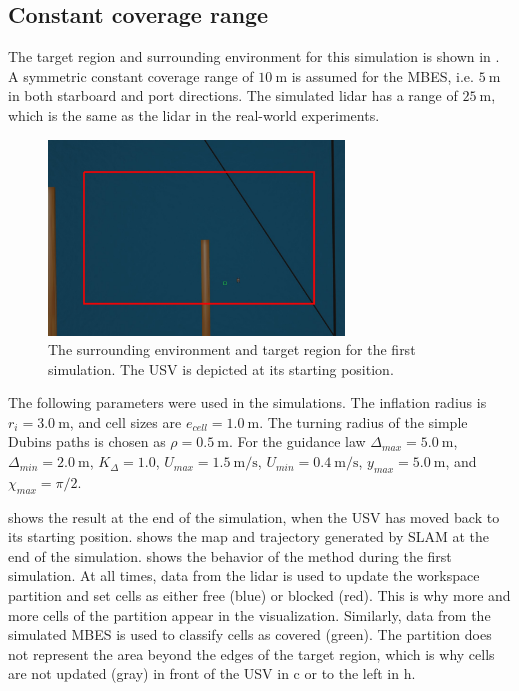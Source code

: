 \subsection{Constant coverage range} \label{sec:sim1}

The target region and surrounding environment for this simulation is shown in . A symmetric constant coverage range of $\SI{10}{\meter}$  is assumed for the MBES, i.e. $\SI{5}{\meter}$ in both starboard and port directions. The simulated lidar has a range of $\SI{25}{\meter}$, which is the same as the lidar in the real-world experiments.

\begin{figure}[h!]
	\centering
	\includegraphics[width=0.7\textwidth]{fig/simulations/target_region_bm_1}
	\caption[The surrounding environment and target region for the first simulation.]{The surrounding environment and target region for the first simulation. The USV is depicted at its starting position.}
	\label{fig:target_region_bm_1}
\end{figure}

The following parameters were used in the simulations. The inflation radius is $r_i = \SI{3.0}{\meter}$, and cell sizes are $e_{cell} = \SI{1.0}{\meter}$. The turning radius of the simple Dubins paths is chosen as $\rho = \SI{0.5}{\meter}$. For the guidance law $\Delta_{max} = \SI{5.0}{\meter}$, $\Delta_{min} = \SI{2.0}{\meter}$, $K_\Delta = 1.0$, $U_{max} = \SI{1.5}{\meter/\second}$, $U_{min} = \SI{0.4}{\meter/\second}$, $y_{max} = \SI{5.0}{\meter}$, and $\chi_{max} = \pi/2$.

 shows the result at the end of the simulation, when the USV has moved back to its starting position.  shows the map and trajectory generated by SLAM at the end of the simulation.  shows the behavior of the method during the first simulation. At all times, data from the lidar is used to update the workspace partition and set cells as either free (blue) or blocked (red). This is why more and more cells of the partition appear in the visualization. Similarly, data from the simulated MBES is used to classify cells as covered (green). The partition does not represent the area beyond the edges of the target region, which is why cells are not updated (gray) in front of the USV in c or to the left in h. 

